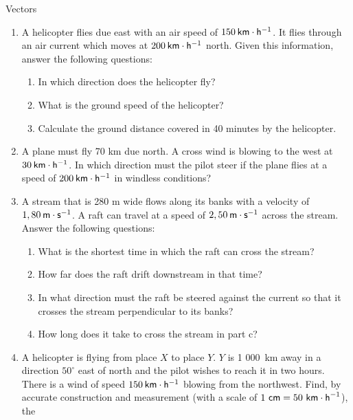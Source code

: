 \begin{eocexercises}{Vectors}
\begin{enumerate}[noitemsep, label=\textbf{\arabic*}.]
            \label{m38819*uid118}\item A helicopter flies due east with an air speed of $150\phantom{\rule{2pt}{0ex}}\mathsf{km}\ensuremath{\cdot}\mathsf{h}{}^{-1}$. It flies through an air current which moves at $200\phantom{\rule{2pt}{0ex}}\mathsf{km}\ensuremath{\cdot}\mathsf{h}{}^{-1}$ north. Given this information, answer the following questions:
\label{m38819*id198203}\begin{enumerate}[noitemsep, label=\textbf{\alph*}. ] 
            \label{m38819*uid119}\item In which direction does the helicopter fly?
\label{m38819*uid120}\item What is the ground speed of the helicopter?
\label{m38819*uid121}\item Calculate the ground distance covered in 40 minutes by the helicopter.
\end{enumerate}
                \label{m38819*uid122}\item A plane must fly 70 km due north. A cross wind is blowing to the west at $30\phantom{\rule{2pt}{0ex}}\mathsf{km}\ensuremath{\cdot}\mathsf{h}{}^{-1}$. In which direction must the pilot steer if the plane flies at a speed of $200\phantom{\rule{2pt}{0ex}}\mathsf{km}\ensuremath{\cdot}\mathsf{h}{}^{-1}$ in windless conditions?\newline
\label{m38819*uid123}\item A stream that is 280 m wide flows along its banks with a velocity of $1,80\phantom{\rule{2pt}{0ex}}\mathsf{m}\ensuremath{\cdot}\mathsf{s}{}^{-1}$. A raft can travel at a speed of $2,50\phantom{\rule{2pt}{0ex}}\mathsf{m}\ensuremath{\cdot}\mathsf{s}{}^{-1}$ across the stream. Answer the following questions:
\label{m38819*id198337}\begin{enumerate}[noitemsep, label=\textbf{\alph*}. ] 
            \label{m38819*uid124}\item What is the shortest time in which the raft can cross the stream?
\label{m38819*uid125}\item How far does the raft drift downstream in that time?
\label{m38819*uid126}\item In what direction must the raft be steered against the current so that it crosses the stream perpendicular to its banks?
\label{m38819*uid127}\item How long does it take to cross the stream in part c?
\end{enumerate}
                \label{m38819*uid128}\item A helicopter is flying from place $X$ to place $Y$. $Y$ is 1 000~km away in a direction ${50}^{\circ }$ east of north and the pilot wishes to reach it in two hours. There is a wind of speed $150\phantom{\rule{2pt}{0ex}}\mathsf{km}\ensuremath{\cdot}\mathsf{h}{}^{-1}$ blowing from the northwest. Find, by accurate construction and measurement (with a scale of $1\phantom{\rule{3.33333pt}{0ex}}\mathsf{cm}=50\phantom{\rule{3.33333pt}{0ex}}{\mathsf{km}\ensuremath{\cdot}\mathsf{h}}^{-1}$), the

\end{enumerate}
\end{eocexercises}
